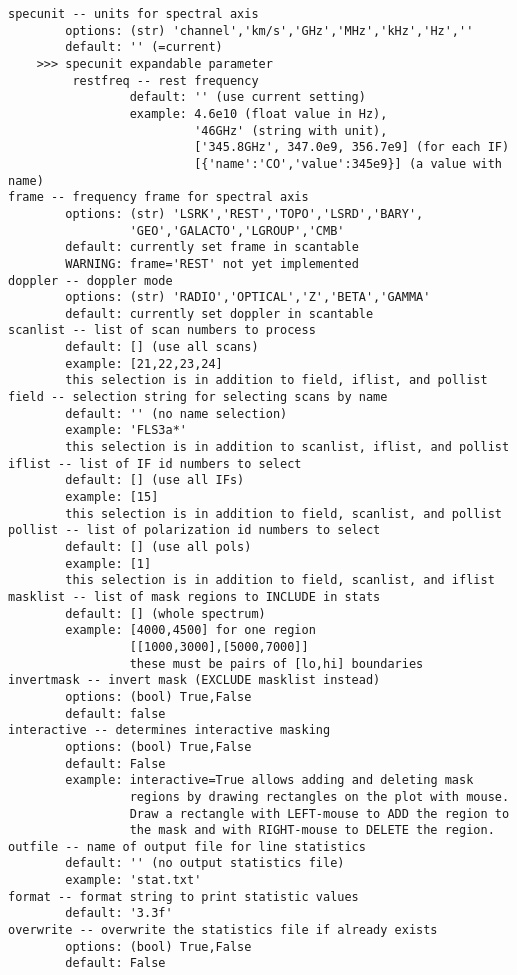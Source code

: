 \begin{verbatim}
specunit -- units for spectral axis
        options: (str) 'channel','km/s','GHz','MHz','kHz','Hz',''
        default: '' (=current)
    >>> specunit expandable parameter
         restfreq -- rest frequency
                 default: '' (use current setting)
                 example: 4.6e10 (float value in Hz),
                          '46GHz' (string with unit),
                          ['345.8GHz', 347.0e9, 356.7e9] (for each IF)
                          [{'name':'CO','value':345e9}] (a value with name)
frame -- frequency frame for spectral axis
        options: (str) 'LSRK','REST','TOPO','LSRD','BARY',
                 'GEO','GALACTO','LGROUP','CMB'
        default: currently set frame in scantable
        WARNING: frame='REST' not yet implemented
doppler -- doppler mode
        options: (str) 'RADIO','OPTICAL','Z','BETA','GAMMA'
        default: currently set doppler in scantable
scanlist -- list of scan numbers to process
        default: [] (use all scans)
        example: [21,22,23,24]
        this selection is in addition to field, iflist, and pollist
field -- selection string for selecting scans by name
        default: '' (no name selection)
        example: 'FLS3a*'
        this selection is in addition to scanlist, iflist, and pollist
iflist -- list of IF id numbers to select
        default: [] (use all IFs)
        example: [15]
        this selection is in addition to field, scanlist, and pollist
pollist -- list of polarization id numbers to select
        default: [] (use all pols)
        example: [1]
        this selection is in addition to field, scanlist, and iflist
masklist -- list of mask regions to INCLUDE in stats
        default: [] (whole spectrum)
        example: [4000,4500] for one region
                 [[1000,3000],[5000,7000]]
                 these must be pairs of [lo,hi] boundaries
invertmask -- invert mask (EXCLUDE masklist instead)
        options: (bool) True,False
        default: false
interactive -- determines interactive masking
        options: (bool) True,False
        default: False
        example: interactive=True allows adding and deleting mask 
                 regions by drawing rectangles on the plot with mouse. 
                 Draw a rectangle with LEFT-mouse to ADD the region to 
                 the mask and with RIGHT-mouse to DELETE the region. 
outfile -- name of output file for line statistics
        default: '' (no output statistics file)
        example: 'stat.txt'
format -- format string to print statistic values
        default: '3.3f'
overwrite -- overwrite the statistics file if already exists 
        options: (bool) True,False
        default: False


\end{verbatim}
